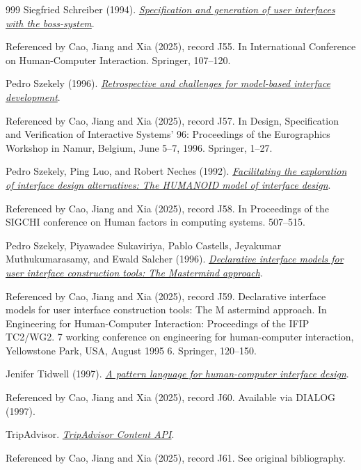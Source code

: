 \documentclass[11pt,letterpaper]{article}
\begin{document}
\begin{thebibliography}{999}
Siegfried Schreiber (1994).
\href{https://arxiv.org/html/2503.04084v1\#bib.bib56}{\emph{Specification and generation of user interfaces with the boss-system}}.
\par {\small Referenced by Cao, Jiang and Xia (2025), record J55. In International Conference on Human-Computer Interaction. Springer, 107–120.}

Pedro Szekely (1996).
\href{https://arxiv.org/html/2503.04084v1\#bib.bib58}{\emph{Retrospective and challenges for model-based interface development}}.
\par {\small Referenced by Cao, Jiang and Xia (2025), record J57. In Design, Specification and Verification of Interactive Systems’ 96: Proceedings of the Eurographics Workshop in Namur, Belgium, June 5–7, 1996. Springer, 1–27.}

Pedro Szekely, Ping Luo, and Robert Neches (1992).
\href{https://doi.org/10.1145/142750.142912}{\emph{Facilitating the exploration of interface design alternatives: The HUMANOID model of interface design}}.
\par {\small Referenced by Cao, Jiang and Xia (2025), record J58. In Proceedings of the SIGCHI conference on Human factors in computing systems. 507–515.}

Pedro Szekely, Piyawadee Sukaviriya, Pablo Castells, Jeyakumar Muthukumarasamy, and Ewald Salcher (1996).
\href{https://usc-isi-i2.github.io/papers/szekely-springer.pdf}{\emph{Declarative interface models for user interface construction tools: The Mastermind approach}}.
\par {\small Referenced by Cao, Jiang and Xia (2025), record J59. Declarative interface models for user interface construction tools: The M astermind approach. In Engineering for Human-Computer Interaction: Proceedings of the IFIP TC2/WG2. 7 working conference on engineering for human-computer interaction, Yellowstone Park, USA, August 1995 6. Springer, 120–150.}

Jenifer Tidwell (1997).
\href{https://arxiv.org/html/2503.04084v1\#bib.bib61}{\emph{A pattern language for human-computer interface design}}.
\par {\small Referenced by Cao, Jiang and Xia (2025), record J60. Available via DIALOG (1997).}

TripAdvisor.
\href{https://developer-tripadvisor.com/content-api/}{\emph{TripAdvisor Content API}}.
\par {\small Referenced by Cao, Jiang and Xia (2025), record J61. See original bibliography.}


\end{thebibliography}
\end{document}
